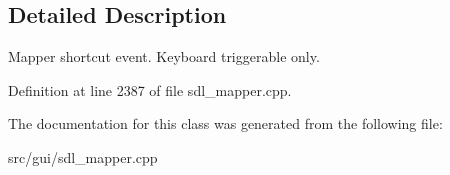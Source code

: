 \subsection{Detailed Description}
Mapper shortcut event. Keyboard triggerable only. 

Definition at line 2387 of file sdl\-\_\-mapper.\-cpp.



The documentation for this class was generated from the following file\-:\begin{DoxyCompactItemize}
\item 
src/gui/sdl\-\_\-mapper.\-cpp\end{DoxyCompactItemize}
